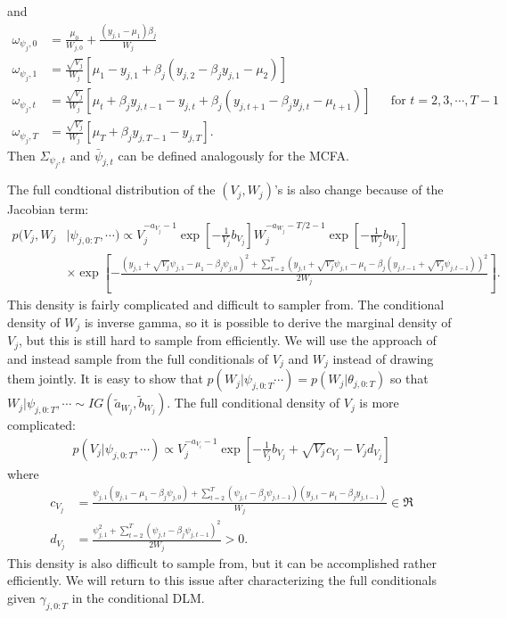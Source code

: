 \documentclass[graybox]{svmult}
\begin{document}
and
\begin{align*}
\omega_{\psi_j,0}&=\frac{\mu_0}{W_{j,0}} + \frac{(y_{j,1} - \mu_1)\beta_j}{W_j}&&\\
\omega_{\psi_j,1}&=\frac{\sqrt{V_j}}{W_j}\left[\mu_1 - y_{j,1} + \beta_j(y_{j,2} - \beta_jy_{j,1} - \mu_2)\right]&&\\
\omega_{\psi_j,t}&=\frac{\sqrt{V_j}}{W_j}\left[\mu_t + \beta_jy_{j,t-1} - y_{j,t} + \beta_j(y_{j,t+1} - \beta_jy_{j,t} - \mu_{t+1})\right]&&\mbox{for } t=2,3,\cdots,T-1\\
\omega_{\psi_j,T}&=\frac{\sqrt{V_j}}{W_j}\left[\mu_T + \beta_jy_{j,T-1} - y_{j,T}\right].&&
\end{align*}
Then $\Sigma_{\psi_j,t}$ and $\bar{\psi}_{j,t}$ can be defined analogously for the MCFA.

The full condtional distribution of the $(V_j,W_j)$'s is also change because of the Jacobian term:
\begin{align*}
p(V_j,W_j&|\psi_{j,0:T},\cdots) \propto V_j^{-a_{V_j}-1}\exp\left[-\frac{1}{V_j}b_{V_j}\right]W_j^{-a_{W_j}-T/2-1}\exp\left[-\frac{1}{W_j}b_{W_j}\right]\\
&\times\exp\left[-\frac{(y_{j,1} + \sqrt{V_j}\psi_{j,1} - \mu_1 - \beta_j\psi_{j,0})^2 +  \sum_{t=2}^T(y_{j,t} + \sqrt{V_j}\psi_{j,t}-\mu_t-\beta_j(y_{j,t-1} + \sqrt{V_j}\psi_{j,t-1}))^2}{2W_j}\right].
\end{align*}
This density is fairly complicated and difficult to sampler from. The conditional density of $W_j$ is inverse gamma, so it is possible to derive the marginal density of $V_j$, but this is still hard to sample from efficiently. We will use the approach of \citet{simpson2014interweaving} and instead sample from the full conditionals of $V_j$ and $W_j$ instead of drawing them jointly. It is easy to show that $p(W_j|\psi_{j,0:T}\cdots)=p(W_j|\theta_{j,0:T})$ so that $W_j|\psi_{j,0:T},\cdots \sim IG(\tilde{a}_{W_j},\tilde{b}_{W_j})$. The full conditional density of $V_j$ is more complicated:
\begin{align*}
p(V_j|\psi_{j,0:T},\cdots) \propto V_j^{-a_{V_i}-1}\exp\left[-\frac{1}{V_j}b_{V_j} + \sqrt{V_j}c_{V_j} - V_jd_{V_j}\right]
\end{align*}
where
\begin{align*}
c_{V_j}&=\frac{\psi_{j,1}(y_{j,1} - \mu_1 - \beta_j\psi_{j,0}) + \sum_{t=2}^T(\psi_{j,t} - \beta_j\psi_{j,t-1})(y_{j,t} - \mu_t - \beta_jy_{j,t-1})}{W_j} \in \Re\\
d_{V_j}&=\frac{\psi_{j,1}^2 + \sum_{t=2}^T(\psi_{j,t} - \beta_j\psi_{j,t-1})^2}{2W_j} > 0.
\end{align*}
This density is also difficult to sample from, but it can be accomplished rather efficiently. We will return to this issue after characterizing the full conditionals given $\gamma_{j,0:T}$ in the conditional DLM.
\end{document}
